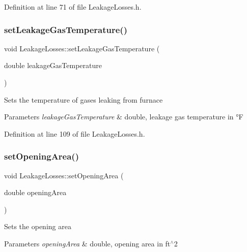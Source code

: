 Definition at line 71 of file Leakage\+Losses.\+h.

\mbox{\label{class_leakage_losses_a379c88c8dea822636a1b9966e2408daa}} 
\subsubsection{\texorpdfstring{set\+Leakage\+Gas\+Temperature()}{setLeakageGasTemperature()}}
{\footnotesize\ttfamily void Leakage\+Losses\+::set\+Leakage\+Gas\+Temperature (\begin{DoxyParamCaption}\item[{double}]{leakage\+Gas\+Temperature }\end{DoxyParamCaption})\hspace{0.3cm}{\ttfamily [inline]}}

Sets the temperature of gases leaking from furnace


\begin{DoxyParams}{Parameters}
{\em leakage\+Gas\+Temperature} & double, leakage gas temperature in °F \\
\hline
\end{DoxyParams}


Definition at line 109 of file Leakage\+Losses.\+h.

\mbox{\label{class_leakage_losses_a417c9914af6b283695bdbd5e92451f9e}} 
\subsubsection{\texorpdfstring{set\+Opening\+Area()}{setOpeningArea()}}
{\footnotesize\ttfamily void Leakage\+Losses\+::set\+Opening\+Area (\begin{DoxyParamCaption}\item[{double}]{opening\+Area }\end{DoxyParamCaption})\hspace{0.3cm}{\ttfamily [inline]}}

Sets the opening area


\begin{DoxyParams}{Parameters}
{\em opening\+Area} & double, opening area in ft$^\wedge$2 \\
\hline
\end{DoxyParams}


